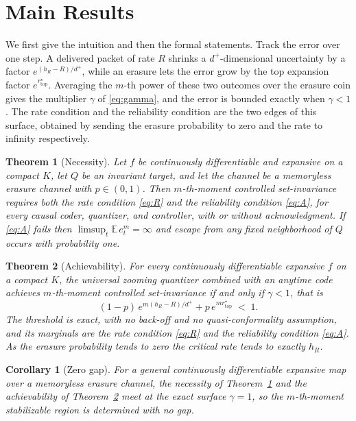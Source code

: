 \documentclass[journal]{IEEEtran}
\newtheorem{theorem}{Theorem}
\newtheorem{corollary}{Corollary}
\theoremstyle{definition}
\theoremstyle{remark}
\newcommand{\rtop}{r^\star_{\mathrm{top}}}
\newcommand{\hR}{h_R}
\newcommand{\E}{\mathbb{E}}
\newcommand{\dplus}{d^{+}}
\begin{document}
\section{Main Results}\label{sec:results}
We first give the intuition and then the formal statements. Track the error over one step. A delivered packet of
rate $R$ shrinks a $\dplus$-dimensional uncertainty by a factor $e^{(\hR-R)/\dplus}$, while an erasure lets the
error grow by the top expansion factor $e^{\rtop}$. Averaging the $m$-th power of these two outcomes over the
erasure coin gives the multiplier $\gamma$ of \eqref{eq:gamma}, and the error is bounded exactly when
$\gamma<1$. The rate condition and the reliability condition are the two edges of this surface, obtained by
sending the erasure probability to zero and the rate to infinity respectively.

\begin{theorem}[Necessity]\label{thm:nec}
Let $f$ be continuously differentiable and expansive on a compact $K$, let $Q$ be an invariant target, and let
the channel be a memoryless erasure channel with $p\in(0,1)$. Then $m$-th-moment controlled set-invariance
requires both the rate condition \eqref{eq:R} and the reliability condition \eqref{eq:A}, for every causal coder,
quantizer, and controller, with or without acknowledgment. If \eqref{eq:A} fails then
$\limsup_{t}\E\,e_t^{m}=\infty$ and escape from any fixed neighborhood of $Q$ occurs with probability one.
\end{theorem}

\begin{theorem}[Achievability]\label{thm:ach}
For every continuously differentiable expansive $f$ on a compact $K$, the universal zooming quantizer combined
with an anytime code achieves $m$-th-moment controlled set-invariance if and only if $\gamma<1$, that is
\begin{equation}
(1-p)\,e^{m(\hR-R)/\dplus}+p\,e^{m\rtop}\;<\;1. \label{eq:exact}
\end{equation}
The threshold is exact, with no back-off and no quasi-conformality assumption, and its marginals are the rate
condition \eqref{eq:R} and the reliability condition \eqref{eq:A}. As the erasure probability tends to zero the
critical rate tends to exactly $\hR$.
\end{theorem}

\begin{corollary}[Zero gap]\label{cor:zerogap2}
For a general continuously differentiable expansive map over a memoryless erasure channel, the necessity of
Theorem~\ref{thm:nec} and the achievability of Theorem~\ref{thm:ach} meet at the exact surface $\gamma=1$, so the
$m$-th-moment stabilizable region is determined with no gap.
\end{corollary}
\end{document}
